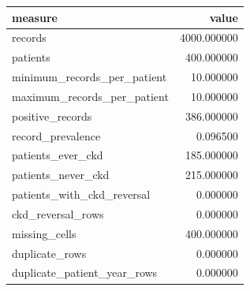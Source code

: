 \begin{tabular}{lr}
\toprule
measure & value \\
\midrule
records & 4000.000000 \\
patients & 400.000000 \\
minimum\_records\_per\_patient & 10.000000 \\
maximum\_records\_per\_patient & 10.000000 \\
positive\_records & 386.000000 \\
record\_prevalence & 0.096500 \\
patients\_ever\_ckd & 185.000000 \\
patients\_never\_ckd & 215.000000 \\
patients\_with\_ckd\_reversal & 0.000000 \\
ckd\_reversal\_rows & 0.000000 \\
missing\_cells & 400.000000 \\
duplicate\_rows & 0.000000 \\
duplicate\_patient\_year\_rows & 0.000000 \\
\bottomrule
\end{tabular}
